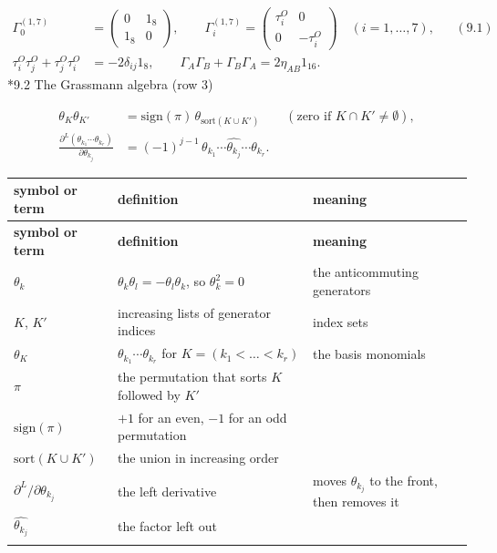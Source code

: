\documentclass[10pt,a4paper]{article}
\makeatletter
\renewcommand\subsection{\@startsection{subsection}{2}{\z@}{-3.25ex\@plus -1ex \@minus -.2ex}{1.5ex \@plus .2ex}{\normalfont\large\bfseries\raggedright}}
\makeatother
\begin{document}
\begin{align*}
\Gamma^{(1,7)}_0&=\begin{pmatrix}0&1_8\\1_8&0\end{pmatrix},\qquad \Gamma^{(1,7)}_i=\begin{pmatrix}\tau^O_i&0\\0&-\tau^O_i\end{pmatrix}\quad(i=1,\dots,7),&&(9.1) \\
\tau^O_i\tau^O_j+\tau^O_j\tau^O_i&=-2\delta_{ij}1_8,\qquad \Gamma_A\Gamma_B+\Gamma_B\Gamma_A=2\eta_{AB}1_{16}.
\end{align*}
\subsection*{9.2 The Grassmann algebra (row 3)}
\begin{align*}
\theta_K\theta_{K'}&=\mathrm{sign}(\pi)\,\theta_{\mathrm{sort}(K\cup K')}\qquad(\text{zero if }K\cap K'\neq\emptyset), \\
\frac{\partial^L(\theta_{k_1}\cdots\theta_{k_r})}{\partial\theta_{k_j}}&=(-1)^{j-1}\,\theta_{k_1}\cdots\widehat{\theta_{k_j}}\cdots\theta_{k_r} .
\end{align*}
{\footnotesize
\begin{longtable}{>{\raggedright\arraybackslash}p{}>{\raggedright\arraybackslash}p{}>{\raggedright\arraybackslash}p{}}
\toprule
\textbf{symbol or term} & \textbf{definition} & \textbf{meaning} \\
\midrule\endfirsthead
\toprule
\textbf{symbol or term} & \textbf{definition} & \textbf{meaning} \\
\midrule\endhead
\endfoot
\bottomrule\endlastfoot
$\theta_k$ & $\theta_k\theta_l=-\theta_l\theta_k$, so $\theta_k^2=0$ & the anticommuting generators \\
$K$, $K'$ & increasing lists of generator indices & index sets \\
$\theta_K$ & $\theta_{k_1}\cdots\theta_{k_r}$ for $K=(k_1<\dots<k_r)$ & the basis monomials \\
$\pi$ & the permutation that sorts $K$ followed by $K'$ &  \\
$\mathrm{sign}(\pi)$ & $+1$ for an even, $-1$ for an odd permutation &  \\
$\mathrm{sort}(K\cup K')$ & the union in increasing order &  \\
$\partial^L/\partial\theta_{k_j}$ & the left derivative & moves $\theta_{k_j}$ to the front, then removes it \\
$\widehat{\theta_{k_j}}$ & the factor left out &  \\*
\end{longtable}}
\end{document}
